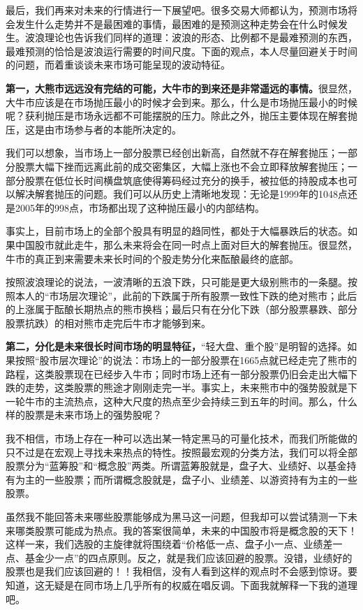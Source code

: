 最后，我们再来对未来的行情进行一下展望吧。很多交易大师都认为，预测市场将会发生什么走势并不是最困难的事情，最困难的是预测这种走势会在什么时候发生。波浪理论也告诉我们同样的道理：波浪的形态、比例都不是最难预测的东西，最难预测的恰恰是波浪运行需要的时间尺度。下面的观点，本人尽量回避关于时间的问题，而着重谈谈未来市场可能呈现的波动特征。

\textbf{第一，大熊市远远没有完结的可能，大牛市的到来还是非常遥远的事情。}很显然，大牛市应该是在市场抛压最小的时候才会到来。那么，什么是市场抛压最小的时候呢？获利抛压是市场永远都不可能摆脱的压力。除此之外，抛压主要体现在解套抛压，这是由市场参与者的本能所决定的。

我们可以想象，当市场上一部分股票已经创出新高，自然就不存在解套抛压；一部分股票大幅下挫而远离此前的成交密集区，大幅上涨也不会立即释放解套抛压；一部分股票在低位长时间横盘筑底使得筹码经过充分的换手，被拉低的持股成本也可以解决解套抛压的问题。我们可以从历史上清晰地发现：无论是1999年的1048点还是2005年的998点，市场都出现了这种抛压最小的内部结构。

事实上，目前市场上的全部个股具有明显的趋同性，都处于大幅暴跌后的状态。如果中国股市就此走牛，那么未来将会在同一时点上面对巨大的解套抛压。很显然，牛市的真正到来需要未来长时间的个股走势分化来酝酿最终的底部。

按照波浪理论的说法，一波清晰的五浪下跌，只可能是更大级别熊市的一条腿。按照本人的“市场层次理论”，此前的下跌属于所有股票一致性下跌的绝对熊市；此后的上涨属于酝酿长期热点的熊市换档；最后只有在分化下跌（部分股票暴跌、部分股票抗跌）的相对熊市走完后牛市才能够到来。

\textbf{第二，分化是未来很长时间市场的明显特征，}“轻大盘、重个股”是明智的选择。如果按照“股市层次理论”的说法：市场上的一部分股票在1665点就已经走完了熊市的路程，这类股票现在已经步入牛市；同时市场上还有一部分股票仍旧会走出大幅下跌的走势，这类股票的熊途才刚刚走完一半。事实上，未来熊市中的强势股就是下一轮牛市的主流热点，这种大尺度的热点至少会持续三到五年的时间。那么，什么样的股票是未来市场上的强势股呢？

我不相信，市场上存在一种可以选出某一特定黑马的可量化技术，而我们所能做的只不过是在宏观上寻找未来热点的特性。按照最宏观的分类方法，我们可以将全部股票分为“蓝筹股”和“概念股”两类。所谓蓝筹股就是，盘子大、业绩好、以基金持有为主的一些股票；而所谓概念股就是，盘子小、业绩差、以游资持有为主的一些股票。

虽然我不能回答未来哪些股票能够成为黑马这一问题，但我却可以尝试猜测一下未来哪类股票可能成为热点。我的答案很简单，未来的中国股市将是概念股的天下！这样一来，我们选股的主旋律就将围绕着“价格低一点、盘子小一点、业绩差一点、基金少一点”的四点原则。反之，就是我们应该回避的股票。没错，业绩好的股票也是我们应该回避的！！我相信，没有人看到这样的观点时不会感到惊讶。要知道，这无疑是在同市场上几乎所有的权威在唱反调。下面我就解释一下我的道理吧。

